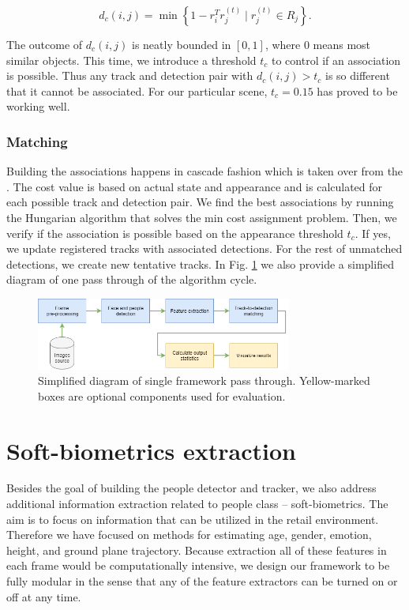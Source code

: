             \begin{equation}
                d_{c}(i,j) = \min \left\{ 1 - r_i^T r_j^{(t)} \mid  r_j^{(t)} \in R_j \right\}.
            \end{equation}
            
            The outcome of $d_c(i,j)$ is neatly bounded in $[0,1]$, where $0$ means most similar objects. This time, we introduce a threshold $t_c$ to control if an association is possible. Thus any track and detection pair with $d_c(i,j) > t_c$ is so different that it cannot be associated. For our particular scene, $t_c = 0.15$ has proved to be working well.

        \subsubsection{Matching}
           Building the associations happens in cascade fashion which is taken over from the \cite{wojke2017simple}. The cost value is based on actual state and appearance and is calculated for each possible track and detection pair. We find the best associations by running the Hungarian algorithm \cite{jonker1987shortest} that solves the min cost assignment problem. Then, we verify if the association is possible based on the appearance threshold $t_c$. If yes, we update registered tracks with associated detections. For the rest of unmatched detections, we create new tentative tracks. In Fig. \ref{fig:framework_diagram} we also provide a simplified diagram of one pass through of the algorithm cycle.
           
           \begin{figure}[ht]
                \centering
                \includegraphics[width=0.75\textwidth]{resources/framework_diagram.png}
                \caption{Simplified diagram of single framework pass through. Yellow-marked boxes are optional components used for evaluation.}
                \label{fig:framework_diagram}
            \end{figure}
            
\section{Soft-biometrics extraction}
    Besides the goal of building the people detector and tracker, we also address additional information extraction related to people class -- soft-biometrics. The aim is to focus on information that can be utilized in the retail environment. Therefore we have focused on methods for estimating age, gender, emotion, height, and ground plane trajectory. Because extraction all of these features in each frame would be computationally intensive, we design our framework to be fully modular in the sense that any of the feature extractors can be turned on or off at any time.
    
